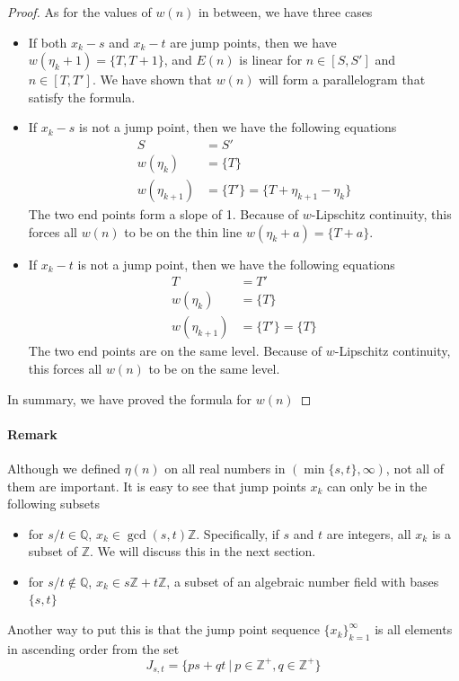 \documentclass[]{article}
\begin{document}
\begin{proof}
	As for the values of $w(n)$ in between, we have three cases
	\begin{itemize}
		\item If both $x_k-s$ and $x_k-t$ are jump points, then we have $w(\eta_k +1) =\{T, T+1\}$, and $E(n)$ is linear for $n \in [S, S']$ and $n \in [T, T']$. We have shown that $w(n)$ will form a parallelogram that satisfy the formula.
		\item If $x_k-s$ is not a jump point, then we have the following equations
		\begin{align*}
		S &= S'\\
		w(\eta_{k}) &= \{T\}\\
		w(\eta_{k+1}) &= \{T'\} = \{T+\eta_{k+1} - \eta_k\}
		\end{align*}
		The two end points form a slope of 1. Because of $w$-Lipschitz continuity, this forces all $w(n)$ to be on the thin line $w(\eta_{k} + a) = \{T+a\}$.
		\item If $x_k-t$ is not a jump point, then we have the following equations
		\begin{align*}
		T &= T'\\
		w(\eta_{k}) &= \{T\}\\
		w(\eta_{k+1}) &= \{T'\} = \{T\}
		\end{align*}
		The two end points are on the same level. Because of $w$-Lipschitz continuity, this forces all $w(n)$ to be on the same level.
	\end{itemize}
	In summary, we have proved the formula for $w(n)$


\end{proof}

\paragraph{Remark}

Although we defined $\eta(n)$ on all real numbers in $(\min\{s, t\}, \infty)$, not all of them are important. It is easy to see that jump points $x_k$ can only be in the following subsets
\begin{itemize}
	\item for $s/t\in\mathbb{Q}$, $x_k \in \gcd(s,t)\mathbb{Z}$. Specifically, if $s$ and $t$ are integers, all  $x_k$ is a subset of $\mathbb{Z}$. We will discuss this in the next section.
	\item for $s/t\notin\mathbb{Q}$, $x_k \in s\mathbb{Z} + t\mathbb{Z}$, a subset of an algebraic number field with bases $\{s, t\}$
\end{itemize}
Another way to put this is that the jump point sequence $\{x_k\}_{k=1}^{\infty}$ is all elements in ascending order from the set
\[
	J_{s,t} = \{ps+qt\ |\  p \in \mathbb{Z}^+, q \in \mathbb{Z}^+\}
\]
\end{document}
